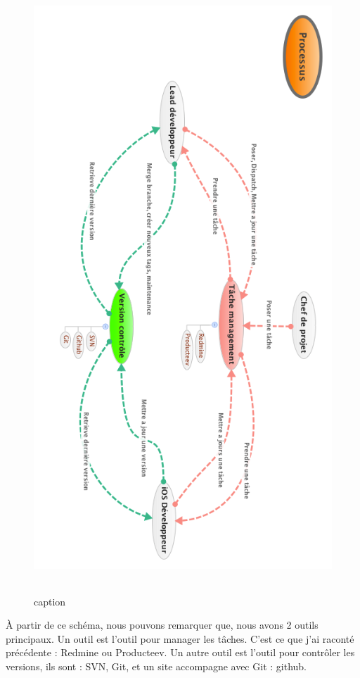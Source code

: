 \begin{figure}[htbp]
	\centering
		\includegraphics[height=9in]{XMinds/ProcessusMobile.png}
	\caption{caption}
	\label{fig:XMinds_ProcessusMobile}
\end{figure}


À partir de ce schéma, nous pouvons remarquer que, nous avons 2 outils principaux. Un outil est l'outil pour manager les tâches. C'est ce que j'ai raconté précédente : Redmine ou Producteev. Un autre outil est l'outil pour contrôler les versions, ils sont : SVN, Git, et un site accompagne avec Git : github. 

